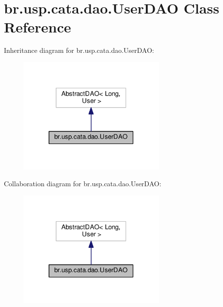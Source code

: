\hypertarget{classbr_1_1usp_1_1cata_1_1dao_1_1_user_d_a_o}{\section{br.\+usp.\+cata.\+dao.\+User\+D\+A\+O Class Reference}
\label{classbr_1_1usp_1_1cata_1_1dao_1_1_user_d_a_o}
}


Inheritance diagram for br.\+usp.\+cata.\+dao.\+User\+D\+A\+O\+:\nopagebreak
\begin{figure}[H]
\begin{center}
\leavevmode
\includegraphics[width=210pt]{classbr_1_1usp_1_1cata_1_1dao_1_1_user_d_a_o__inherit__graph}
\end{center}
\end{figure}


Collaboration diagram for br.\+usp.\+cata.\+dao.\+User\+D\+A\+O\+:\nopagebreak
\begin{figure}[H]
\begin{center}
\leavevmode
\includegraphics[width=210pt]{classbr_1_1usp_1_1cata_1_1dao_1_1_user_d_a_o__coll__graph}
\end{center}
\end{figure}
